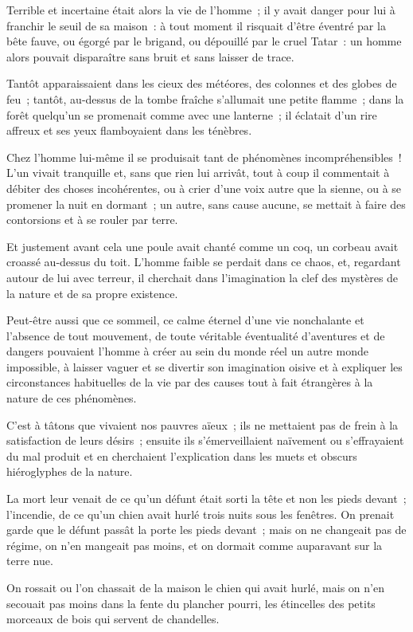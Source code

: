 \documentclass[french,twoside]{book} %
\begin{document}
Terrible et incertaine était alors la vie de l’homme ; il y avait danger pour lui à franchir le seuil de sa maison : à tout moment il risquait d’être éventré par la bête fauve, ou égorgé par le brigand, ou dépouillé par le cruel Tatar : un homme alors pouvait disparaître sans bruit et sans laisser de trace.\par
Tantôt apparaissaient dans les cieux des météores, des colonnes et des globes de feu ; tantôt, au-dessus de la tombe fraîche s’allumait une petite flamme ; dans la forêt quelqu’un se promenait comme avec une lanterne ; il éclatait d’un rire affreux et ses yeux flamboyaient dans les ténèbres.\par
Chez l’homme lui-même il se produisait tant de phénomènes incompréhensibles ! L’un vivait tranquille et, sans que rien lui arrivât, tout à coup il commentait à débiter des choses incohérentes, ou à crier d’une voix autre que la sienne, ou à se promener la nuit en dormant ; un autre, sans cause aucune, se mettait à faire des contorsions et à se rouler par terre.\par
Et justement avant cela une poule avait chanté comme un coq, un corbeau avait croassé au-dessus du toit. L’homme faible se perdait dans ce chaos, et, regardant autour de lui avec terreur, il cherchait dans l’imagination la clef des mystères de la nature et de sa propre existence.\par
Peut-être aussi que ce sommeil, ce calme éternel d’une vie nonchalante et l’absence de tout mouvement, de toute véritable éventualité d’aventures et de dangers pouvaient l’homme à créer au sein du monde réel un autre monde impossible, à laisser vaguer et se divertir son imagination oisive et à expliquer les circonstances habituelles de la vie par des causes tout à fait étrangères à la nature de ces phénomènes.\par
C’est à tâtons que vivaient nos pauvres aïeux ; ils ne mettaient pas de frein à la satisfaction de leurs désirs ; ensuite ils s’émerveillaient naïvement ou s’effrayaient du mal produit et en cherchaient l’explication dans les muets et obscurs hiéroglyphes de la nature.\par
La mort leur venait de ce qu’un défunt était sorti la tête et non les pieds devant ; l’incendie, de ce qu’un chien avait hurlé trois nuits sous les fenêtres. On prenait garde que le défunt passât la porte les pieds devant ; mais on ne changeait pas de régime, on n’en mangeait pas moins, et on dormait comme auparavant sur la terre nue.\par
On rossait ou l’on chassait de la maison le chien qui avait hurlé, mais on n’en secouait pas moins dans la fente du plancher pourri, les étincelles des petits morceaux de bois qui servent de chandelles.\par
\end{document}
